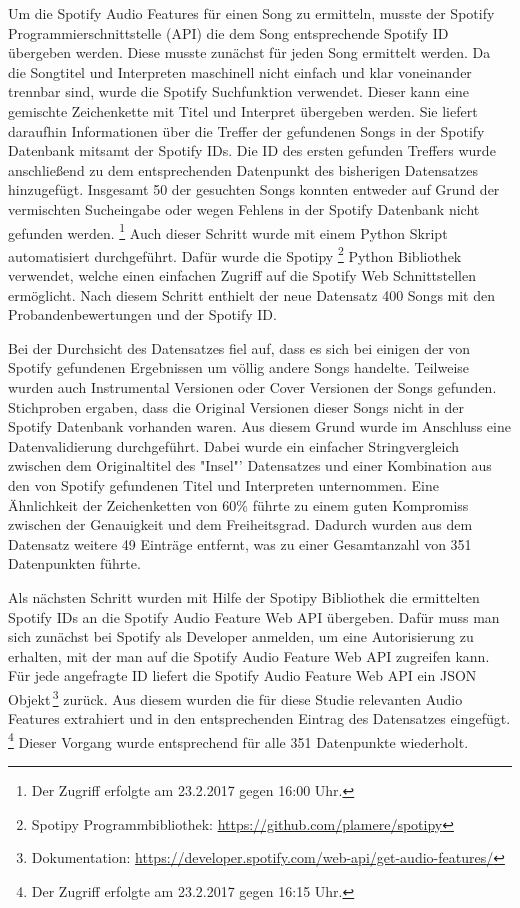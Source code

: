 Um die Spotify Audio Features für einen Song zu ermitteln, musste der Spotify Programmierschnittstelle (API) die dem Song entsprechende Spotify ID übergeben werden.
Diese musste zunächst für jeden Song ermittelt werden.
Da die Songtitel und Interpreten maschinell nicht einfach und klar voneinander trennbar sind, wurde die Spotify Suchfunktion verwendet.
Dieser kann eine gemischte Zeichenkette mit Titel und Interpret übergeben werden.
Sie liefert daraufhin Informationen über die Treffer der gefundenen Songs in der Spotify Datenbank mitsamt der Spotify IDs.
Die ID des ersten gefunden Treffers wurde anschließend zu dem entsprechenden Datenpunkt des bisherigen Datensatzes hinzugefügt.
Insgesamt 50 der gesuchten Songs konnten entweder auf Grund der vermischten Sucheingabe oder wegen Fehlens in der Spotify Datenbank nicht gefunden werden.
\footnote{Der Zugriff erfolgte am 23.2.2017 gegen 16:00 Uhr.}
Auch dieser Schritt wurde mit einem Python Skript automatisiert durchgeführt.
Dafür wurde die Spotipy \footnote{Spotipy Programmbibliothek: \url{https://github.com/plamere/spotipy}} Python Bibliothek verwendet, welche einen einfachen Zugriff auf die Spotify Web Schnittstellen ermöglicht.
Nach diesem Schritt enthielt der neue Datensatz 400 Songs mit den Probandenbewertungen und der Spotify ID.

Bei der Durchsicht des Datensatzes fiel auf, dass es sich bei einigen der von Spotify gefundenen Ergebnissen um völlig andere Songs handelte.
Teilweise wurden auch Instrumental Versionen oder Cover Versionen der Songs gefunden.
Stichproben ergaben, dass die Original Versionen dieser Songs nicht in der Spotify Datenbank vorhanden waren.
Aus diesem Grund wurde im Anschluss eine Datenvalidierung durchgeführt.
Dabei wurde ein einfacher Stringvergleich zwischen dem Originaltitel des "Insel"' Datensatzes und einer Kombination aus den von Spotify gefundenen Titel und Interpreten unternommen.
Eine Ähnlichkeit der Zeichenketten von 60\% führte zu einem guten Kompromiss zwischen der Genauigkeit und dem Freiheitsgrad.
Dadurch wurden aus dem Datensatz weitere 49 Einträge entfernt, was zu einer Gesamtanzahl von 351 Datenpunkten führte.

Als nächsten Schritt wurden mit Hilfe der Spotipy Bibliothek die ermittelten Spotify IDs an die Spotify Audio Feature Web API  übergeben.
Dafür muss man sich zunächst bei Spotify als Developer anmelden, um eine Autorisierung zu erhalten, mit der man auf die Spotify Audio Feature Web API zugreifen kann.
Für jede angefragte ID liefert die Spotify Audio Feature Web API ein JSON Objekt\,\footnote{Dokumentation: \url{https://developer.spotify.com/web-api/get-audio-features/}} zurück.
Aus diesem wurden die für diese Studie relevanten Audio Features extrahiert und in den entsprechenden Eintrag des Datensatzes eingefügt.
\footnote{Der Zugriff erfolgte am 23.2.2017 gegen 16:15 Uhr.}
Dieser Vorgang wurde entsprechend für alle 351 Datenpunkte wiederholt.

